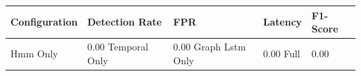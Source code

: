 \begin{tabular}{lllll}
\toprule
Configuration & Detection Rate & FPR & Latency & F1-Score \\
\midrule
Hmm Only & 0.00%
Temporal Only & 0.00%
Graph Lstm Only & 0.00%
Full & 0.00%
\bottomrule
\end{tabular}

